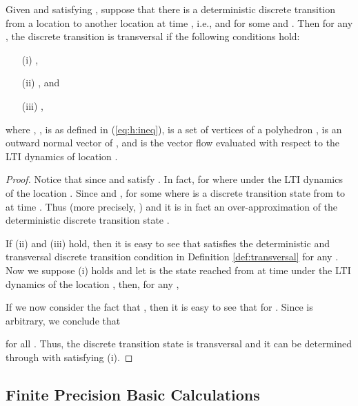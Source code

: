 \begin{lem} \label{lem:cond:exact:transv}
Given  and  satisfying ,
suppose that there is a deterministic discrete transition from a location  to another location  at time , i.e.,  and  for some  and . 
Then for any , the discrete transition is transversal if the following conditions hold:
\begin{itemize}
\item[(i)] , 
\item[(ii)] , and
\item[(iii)] ,
\end{itemize}
where ,  ,  is as defined in (\ref{eq:h:ineq}),  is a set of vertices of a polyhedron ,  is an outward normal vector of , and  is the vector flow evaluated with respect to the LTI dynamics of location .
\end{lem}
\begin{proof}
Notice that  since  and  satisfy .
In fact,  for  where  under the LTI dynamics of the location .
Since  and ,  for some  where  is a discrete transition state from  to  at time .
Thus  (more precisely, ) and it is in fact an over-approximation of the deterministic discrete transition state .

If (ii) and (iii) hold, then it is easy to see that  satisfies the deterministic and transversal discrete transition condition in Definition \ref{def:transversal} for any .
Now we suppose (i) holds 
and let  is the state reached from  at time  under the LTI dynamics of the location , then,  for any , 
 

If we now consider the fact that , then it is easy to see that  for .
Since  is arbitrary, we conclude that 

for all .
Thus, the discrete transition state  is transversal and it can be determined through  with  satisfying (i).
\end{proof}



\subsection{Finite Precision Basic Calculations}  \label{sec:cond:basic}


